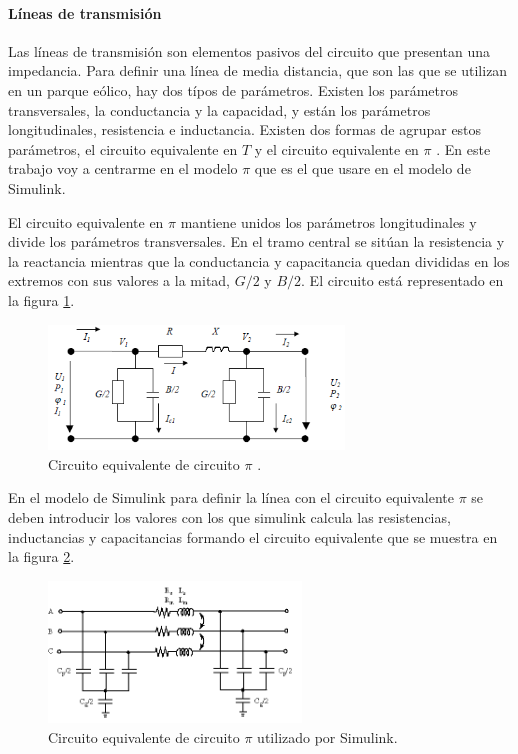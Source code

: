 \documentclass{book}
\begin{document}
		\paragraph {L\'ineas de transmisi\'on}
Las l\'ineas de transmisi\'on son elementos pasivos del circuito que presentan una impedancia. Para definir una l\'inea de media distancia, que son las que se utilizan en un parque e\'olico, hay dos t\'ipos de par\'ametros. Existen los par\'ametros transversales, la conductancia y la capacidad, y est\'an los  par\'ametros longitudinales, resistencia e inductancia. Existen dos formas de agrupar estos par\'ametros, el circuito equivalente en $T$ y el circuito equivalente en $\pi$ \cite{LibroRedesLineas}. En este trabajo voy a centrarme en el modelo $\pi$ que es el que usare en el modelo de Simulink.  \par

El circuito equivalente en $\pi$ mantiene unidos los par\'ametros longitudinales y divide los par\'ametros transversales. En el tramo central se sit\'uan la resistencia y la reactancia mientras que la conductancia y capacitancia quedan divididas en los extremos con sus valores a la mitad, $G/2$ y $B/2$. El circuito est\'a representado en la figura \ref{CircuitoPi}. \par 

\begin{figure}[h!]
\centering
\includegraphics[width=0.7\textwidth]{CircuitoPi.PNG}
\caption{Circuito equivalente de circuito $\pi$ \cite{LibroRedesLineas}. }
\label{CircuitoPi}
\end{figure} \par

En el modelo de Simulink para definir la l\'inea con el circuito equivalente  $\pi$ se deben introducir los valores con los que simulink calcula las resistencias, inductancias y capacitancias formando el circuito equivalente que se muestra en la figura \ref{PiSectionSimulink}.  \par 

\begin{figure}[h!]
\centering
\includegraphics[width=0.6\textwidth]{PiSectionSimulink.PNG}
\caption{Circuito equivalente de circuito $\pi$ utilizado por Simulink. }
\label{PiSectionSimulink}
\end{figure} \par
\end{document}
